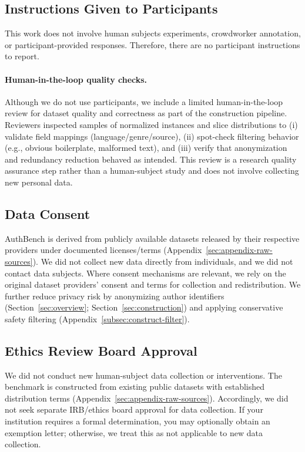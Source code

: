 \documentclass{article}
\begin{document}
\subsection{Instructions Given to Participants}
\label{sec:checklist-d1}
This work does not involve human subjects experiments, crowdworker annotation, or participant-provided responses.
Therefore, there are no participant instructions to report.

\paragraph{Human-in-the-loop quality checks.}
Although we do not use participants, we include a limited human-in-the-loop review for dataset quality and correctness as part of the construction pipeline.
Reviewers inspected samples of normalized instances and slice distributions to (i) validate field mappings (language/genre/source), (ii) spot-check filtering behavior (e.g., obvious boilerplate, malformed text), and (iii) verify that anonymization and redundancy reduction behaved as intended.
This review is a research quality assurance step rather than a human-subject study and does not involve collecting new personal data.


\subsection{Data Consent}
\label{sec:checklist-d3}
AuthBench is derived from publicly available datasets released by their respective providers under documented licenses/terms (Appendix~\ref{sec:appendix-raw-sources}).
We did not collect new data directly from individuals, and we did not contact data subjects.
Where consent mechanisms are relevant, we rely on the original dataset providers’ consent and terms for collection and redistribution.
We further reduce privacy risk by anonymizing author identifiers (Section~\ref{sec:overview}; Section~\ref{sec:construction}) and applying conservative safety filtering (Appendix~\ref{subsec:construct-filter}).

\subsection{Ethics Review Board Approval}
\label{sec:checklist-d4}
We did not conduct new human-subject data collection or interventions.
The benchmark is constructed from existing public datasets with established distribution terms (Appendix~\ref{sec:appendix-raw-sources}).
Accordingly, we did not seek separate IRB/ethics board approval for data collection.
If your institution requires a formal determination, you may optionally obtain an exemption letter; otherwise, we treat this as not applicable to new data collection.
\end{document}
